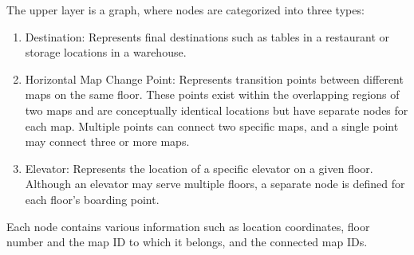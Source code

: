 \documentclass[en]{snu-cse-bsc-thesis}
\begin{document}
The upper layer is a graph, where nodes are categorized into three types:
\begin{enumerate}
  \item Destination: Represents final destinations such as tables in a restaurant or storage locations in a warehouse.
  \item Horizontal Map Change Point: Represents transition points between different maps on the same floor. These points exist within the overlapping regions of two maps and are conceptually identical locations but have separate nodes for each map. Multiple points can connect two specific maps, and a single point may connect three or more maps.
  \item Elevator: Represents the location of a specific elevator on a given floor. Although an elevator may serve multiple floors, a separate node is defined for each floor's boarding point.
\end{enumerate}
Each node contains various information such as location coordinates, floor number and the map ID to which it belongs, and the connected map IDs.
\end{document}
